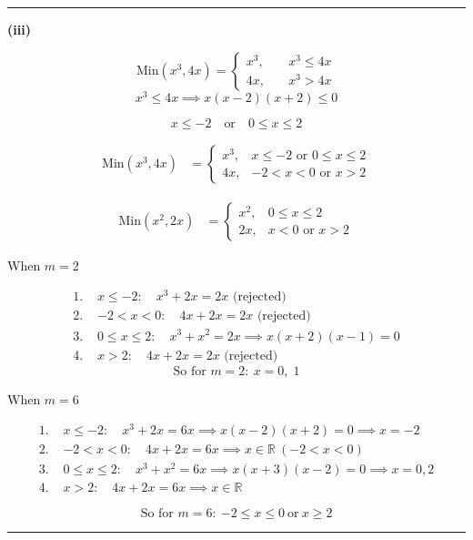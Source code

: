 \documentclass[12pt]{article}
\begin{document}
\bigskip\hrule\bigskip

\textbf{(iii)}

$$
\mathrm{Min}(x^3,4x)=
\begin{cases}
x^3, & \quad x^3\leq4x\\
4x, &\quad x^3>4x
\end{cases}
$$
$$x^3\leq4x\implies x(x-2)(x+2)\leq0$$

$$x\leq-2\quad\text{or}\quad0\leq x\leq2$$

\begin{align*}
\mathrm{Min}(x^3,4x)
&=
\begin{cases}
x^3, & x\leq-2\text{ or }0\leq x\leq2\\
4x, & -2<x<0\text{ or }x>2
\end{cases}
\end{align*}

\begin{align*}
\mathrm{Min}(x^2,2x)
&=
\begin{cases}
x^2, & 0\leq x\leq2\\
2x, & x<0\text{ or }x>2
\end{cases}
\end{align*}

When $m=2$

\begin{align*}
\text{1. }&x\leq-2:\quad x^3+2x=2x \text{ (rejected)}\\
\text{2. }&-2<x<0:\quad 4x+2x=2x \text{ (rejected)}\\
\text{3. }&0\leq x\leq2:\quad x^3+x^2=2x\implies x(x+2)(x-1)=0\\
\text{4. }&x>2:\quad 4x+2x=2x\text{ (rejected)}
\end{align*}
$$\text{So for }m=2:\ \boxed{x=0,\; 1}$$

When $m=6$

\begin{align*}
\text{1. }&x\leq-2:\quad x^3+2x=6x \implies x(x-2)(x+2)=0\implies x=-2\\
\text{2. }&-2<x<0:\quad 4x+2x=6x \implies x\in\mathbb{R} \ (-2<x<0)\\
\text{3. }&0\leq x\leq2:\quad x^3+x^2=6x \implies x(x+3)(x-2)=0\implies x=0, 2\\
\text{4. }&x>2:\quad 4x+2x=6x \implies x\in \mathbb{R}
\end{align*}

$$\text{So for }m=6:\ \boxed{-2\leq x\leq0\ \text{or}\  x\geq2}$$

\bigskip\hrule\bigskip
\end{document}
